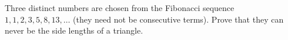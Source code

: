 Three distinct numbers are chosen from the Fibonacci sequence $1,1,2,3,5,8,13,\dots$ (they need not be consecutive terms). Prove that they can never be the side lengths of a triangle.
